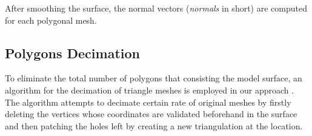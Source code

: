 After smoothing the surface, the normal vectors (\emph{normals} in short) are computed for each polygonal mesh.

\subsection{Polygons Decimation}
\label{subsec:decimation}

To eliminate the total number of polygons that consisting the model surface, an algorithm for the decimation of triangle meshes is employed in our approach \cite{Schroeder1992}.
The algorithm attempts to decimate certain rate of original meshes by firstly deleting the vertices whose coordinates are validated beforehand in the surface and then patching the holes left by creating a new triangulation at the location. %

